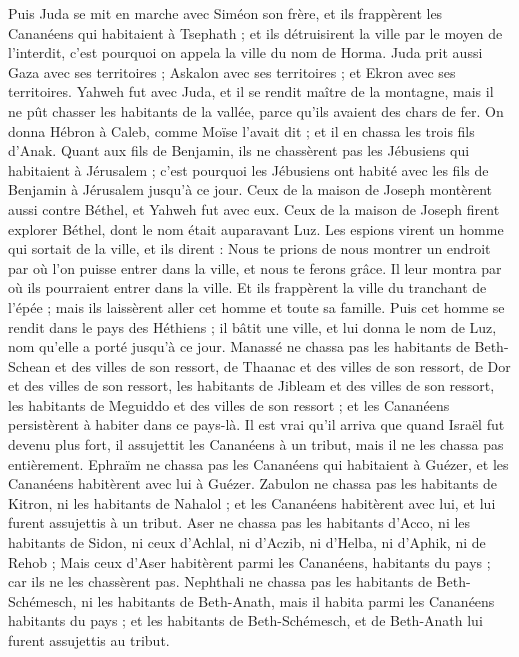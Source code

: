 \begin{multicols}{2}
Puis Juda se mit en marche avec Siméon son frère, et ils frappèrent les Cananéens qui habitaient à Tsephath ; et ils détruisirent la ville par le moyen de l'interdit, c'est pourquoi on appela la ville du nom de Horma.
Juda prit aussi Gaza avec ses territoires ; Askalon avec ses territoires ; et Ekron avec ses territoires.
Yahweh fut avec Juda, et il se rendit maître de la montagne, mais il ne pût chasser les habitants de la vallée, parce qu'ils avaient des chars de fer.
On donna Hébron à Caleb, comme Moïse l'avait dit ; et il en chassa les trois fils d'Anak.
Quant aux fils de Benjamin, ils ne chassèrent pas les Jébusiens qui habitaient à Jérusalem ; c'est pourquoi les Jébusiens ont habité avec les fils de Benjamin à Jérusalem jusqu'à ce jour.
Ceux de la maison de Joseph montèrent aussi contre Béthel, et Yahweh fut avec eux.
Ceux de la maison de Joseph firent explorer Béthel, dont le nom était auparavant Luz.
Les espions virent un homme qui sortait de la ville, et ils dirent : Nous te prions de nous montrer un endroit par où l’on puisse entrer dans la ville, et nous te ferons grâce.
Il leur montra par où ils pourraient entrer dans la ville. Et ils frappèrent la ville du tranchant de l'épée ; mais ils laissèrent aller cet homme et toute sa famille.
Puis cet homme se rendit dans le pays des Héthiens ; il bâtit une ville, et lui donna le nom de Luz, nom qu’elle a porté jusqu'à ce jour.
Manassé ne chassa pas les habitants de Beth-Schean et des villes de son ressort, de Thaanac et des villes de son ressort, de Dor et des villes de son ressort, les habitants de Jibleam et des villes de son ressort, les habitants de Meguiddo et des villes de son ressort ; et les Cananéens persistèrent à habiter dans ce pays-là.
Il est vrai qu’il arriva que quand Israël fut devenu plus fort, il assujettit les Cananéens à un tribut, mais il ne les chassa pas entièrement.
Ephraïm ne chassa pas les Cananéens qui habitaient à Guézer, et les Cananéens habitèrent avec lui à Guézer.
Zabulon ne chassa pas les habitants de Kitron, ni les habitants de Nahalol ; et les Cananéens habitèrent avec lui, et lui furent assujettis à un tribut.
Aser ne chassa pas les habitants d’Acco, ni les habitants de Sidon, ni ceux d’Achlal, ni d'Aczib, ni d'Helba, ni d'Aphik, ni de Rehob ;
Mais ceux d'Aser habitèrent parmi les Cananéens, habitants du pays ; car ils ne les chassèrent pas.
Nephthali ne chassa pas les habitants de Beth-Schémesch, ni les habitants de Beth-Anath, mais il habita parmi les Cananéens habitants du pays ; et les habitants de Beth-Schémesch, et de Beth-Anath lui furent assujettis au tribut.

\end{multicols}
